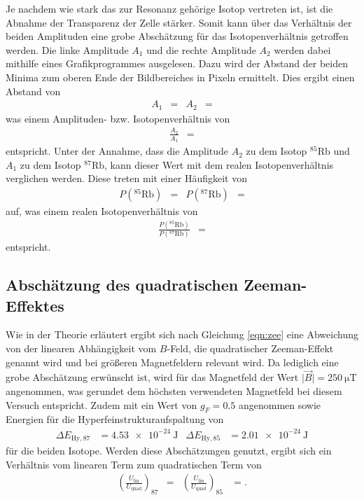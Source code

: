 Je nachdem wie stark das zur Resonanz gehörige Isotop vertreten ist, ist die Abnahme der Transparenz der Zelle stärker.
Somit kann über das Verhältnis der beiden Amplituden eine grobe Abschätzung für das Isotopenverhältnis getroffen werden.
Die linke Amplitude $A_1$ und die rechte Amplitude $A_2$ werden dabei mithilfe eines Grafikprogrammes ausgelesen.
Dazu wird der Abstand der beiden Minima zum oberen Ende der Bildbereiches in Pixeln ermittelt.
Dies ergibt einen Abstand von
\begin{align*}
  A_1 &=  & A_2 &= 
\end{align*}
was einem Amplituden- bzw. Isotopenverhältnis von
\begin{align*}
  \frac{A_2}{A_1} &= 
\end{align*}
entspricht.
Unter der Annahme, dass die Amplitude $A_2$ zu dem Isotop $^{85}\text{Rb}$ und $A_1$ zu dem Isotop $^{87}\text{Rb}$, kann dieser Wert mit dem realen Isotopenverhältnis \cite{fuck} verglichen werden.
Diese treten mit einer Häufigkeit von
\begin{align*}
  P\left(^{85}\text{Rb}\right) &=  & P\left(^{87}\text{Rb}\right) &= 
\end{align*}
auf, was einem realen Isotopenverhältnis von
\begin{align*}
  \frac{P\left(^{85}\text{Rb}\right)}{P\left(^{87}\text{Rb}\right)} &= 
\end{align*}
entspricht.

\subsection{Abschätzung des quadratischen Zeeman-Effektes}
Wie in der Theorie erläutert ergibt sich nach Gleichung \eqref{eqn:zee} eine Abweichung von der linearen Abhängigkeit vom $B$-Feld, die quadratischer Zeeman-Effekt genannt wird und bei größeren Magnetfeldern relevant wird.
Da lediglich eine grobe Abschätzung erwünscht ist, wird für das Magnetfeld der Wert $\lvert \vec{B} \rvert = \SI{250}{\micro\tesla}$ angenommen, was gerundet dem höchsten verwendeten Magnetfeld bei diesem Versuch entspricht.
Zudem mit ein Wert von $g_F = \num{0.5}$ angenommen sowie Energien für die Hyperfeinstrukturaufspaltung \cite{skript} von
\begin{align*}
  \Delta E_{\text{Hy},87} &= \SI{4.53e-24}{\joule} & \Delta E_{\text{Hy}, 85} &= \SI{2.01e-24}{\joule}
\end{align*}
für die beiden Isotope.
Werden diese Abschätzungen genutzt, ergibt sich ein Verhältnis vom linearen Term zum quadratischen Term von
\begin{align*}
  \left(\frac{U_\text{lin}}{U_\text{quad}}\right)_{87} &=  & \left(\frac{U_\text{lin}}{U_\text{quad}}\right)_{85} &= .
\end{align*}

